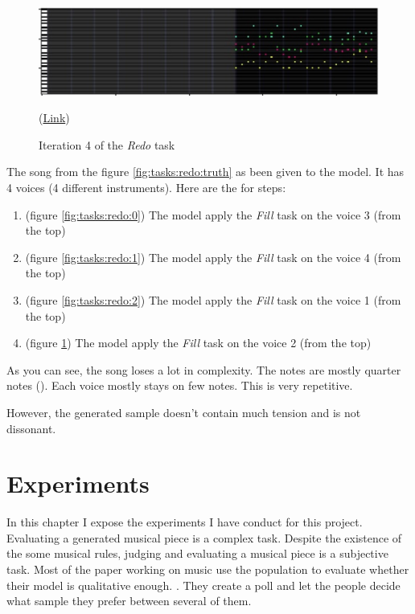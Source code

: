 \documentclass[12pt]{report}
\begin{document}
\begin{figure}[htbp]
    \centering
    \includegraphics[width=\textwidth]{images/generated_midis/tasks/redo/task-redo-3.jpg}
    \caption{Iteration 4 of the \textit{Redo} task}
    (\href{https://github.com/ValentinVignal/midiGenerator/blob/master/samples/tasks/redo_3_(inst_1).mid}{Link})
    \label{fig:tasks:redo:3}
\end{figure}

The song from the figure \ref{fig:tasks:redo:truth} as been given to the model.
It has 4 voices (4 different instruments).
Here are the for steps:
\begin{enumerate}
    \item (figure \ref{fig:tasks:redo:0}) The model apply the \textit{Fill} task on the voice 3 (from the top)
    \item (figure \ref{fig:tasks:redo:1}) The model apply the \textit{Fill} task on the voice 4 (from the top)
    \item (figure \ref{fig:tasks:redo:2}) The model apply the \textit{Fill} task on the voice 1 (from the top)
    \item (figure \ref{fig:tasks:redo:3}) The model apply the \textit{Fill} task on the voice 2 (from the top)
\end{enumerate}

As you can see, the song loses a lot in complexity.
The notes are mostly quarter notes (\musQuarter).
Each voice mostly stays on few notes.
This is very repetitive.

However, the generated sample doesn't contain much tension and is not dissonant.


\chapter{Experiments}
\label{chap:experiments}

In this chapter I expose the experiments I have conduct for this project.
Evaluating a generated musical piece is a complex task.
Despite the existence of the some musical rules, judging and evaluating a musical piece is a subjective task.
Most of the paper working on music use the population to evaluate whether their model is qualitative enough. \cite{huang_counterpoint_2017, hadjeres_deepbach:_2016, huang_music_2018, liang_automatic_2017, huang_bach_2019}.
They create a poll and let the people decide what sample they prefer between several of them.
\end{document}

